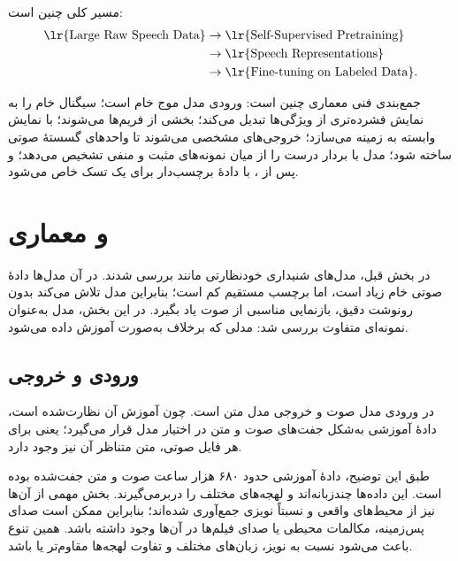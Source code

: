 مسیر کلی چنین است:
\[
\begin{aligned}
\text{\lr{Large Raw Speech Data}} &\rightarrow
\text{\lr{Self-Supervised Pretraining}}\\
&\rightarrow \text{\lr{Speech Representations}}\\
&\rightarrow \text{\lr{Fine-tuning on Labeled Data}}.
\end{aligned}
\]

جمع‌بندی فنی معماری  چنین است: ورودی مدل موج خام است؛  سیگنال خام را به نمایش فشرده‌تری از ویژگی‌ها تبدیل می‌کند؛ بخشی از فریم‌ها  می‌شوند؛  با  نمایش وابسته به زمینه می‌سازد؛ خروجی‌های مشخصی  می‌شوند تا واحدهای گسستهٔ صوتی ساخته شود؛ مدل با  بردار درست را از میان نمونه‌های مثبت و منفی تشخیص می‌دهد؛ و پس از ، با دادهٔ برچسب‌دار برای یک تسک خاص  می‌شود.


\section{ و معماری }
در بخش قبل، مدل‌های شنیداری خودنظارتی مانند  بررسی شدند. در آن مدل‌ها دادهٔ صوتی خام زیاد است، اما برچسب مستقیم کم است؛ بنابراین مدل تلاش می‌کند بدون رونوشت دقیق، بازنمایی مناسبی از صوت یاد بگیرد. در این بخش، مدل  به‌عنوان نمونه‌ای متفاوت بررسی شد: مدلی که برخلاف  به‌صورت  آموزش داده می‌شود.

\subsection{ورودی و خروجی }
در  ورودی مدل صوت و خروجی مدل متن است. چون آموزش آن نظارت‌شده است، دادهٔ آموزشی به‌شکل جفت‌های صوت و متن در اختیار مدل قرار می‌گیرد؛ یعنی برای هر فایل صوتی، متن متناظر آن نیز وجود دارد.

طبق این توضیح، دادهٔ آموزشی  حدود ۶۸۰ هزار ساعت صوت و متن جفت‌شده بوده است. این داده‌ها چندزبانه‌اند و لهجه‌های مختلف را دربرمی‌گیرند. بخش مهمی از آن‌ها نیز از محیط‌های واقعی و نسبتاً نویزی جمع‌آوری شده‌اند؛ بنابراین ممکن است صدای پس‌زمینه، مکالمات محیطی یا صدای فیلم‌ها در آن‌ها وجود داشته باشد. همین تنوع باعث می‌شود  نسبت به نویز، زبان‌های مختلف و تفاوت لهجه‌ها مقاوم‌تر یا  باشد.

